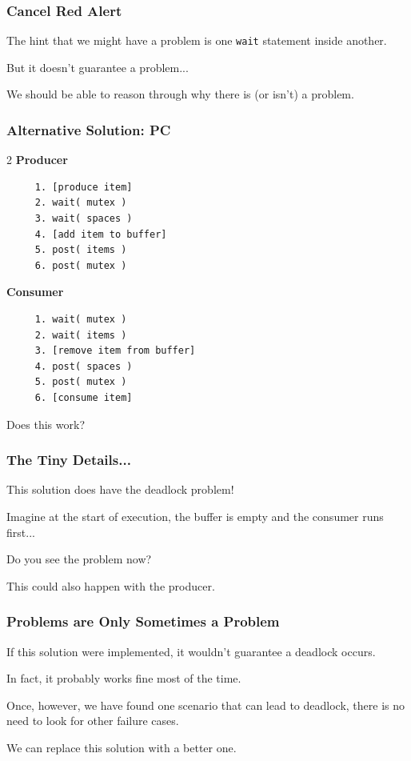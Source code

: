 \begin{frame}
	\frametitle{Cancel Red Alert}

	The hint that we might have a problem is one \texttt{wait} statement inside another.

	But it doesn't guarantee a problem...

	We should be able to reason through why there is (or isn't) a problem.

\end{frame}

\begin{frame}[fragile]
	\frametitle{Alternative Solution: PC}

	\begin{multicols}{2}
		\textbf{Producer}
		\begin{verbatim}
	 1. [produce item]
	 2. wait( mutex )
	 3. wait( spaces )
	 4. [add item to buffer]
	 5. post( items )
	 6. post( mutex )
  		\end{verbatim}
		\columnbreak
		\textbf{Consumer}\vspace{-2em}
		\begin{verbatim}
	 1. wait( mutex )
	 2. wait( items )
	 3. [remove item from buffer]
	 4. post( spaces )
	 5. post( mutex )
	 6. [consume item]
  		\end{verbatim}
	\end{multicols}
	\vspace{-2em}

	Does this work?
\end{frame}

\begin{frame}
	\frametitle{The Tiny Details...}

	This solution does have the deadlock problem!

	Imagine at the start of execution, the buffer is empty and the consumer runs first...

	Do you see the problem now?

	This could also happen with the producer.

\end{frame}

\begin{frame}
	\frametitle{Problems are Only Sometimes a Problem}

	If this solution were implemented, it wouldn't guarantee a deadlock occurs.

	In fact, it probably works fine most of the time.


	Once, however, we have found one scenario that can lead to deadlock, there is no need to look for other failure cases.

	We can replace this solution with a better one.

\end{frame}

